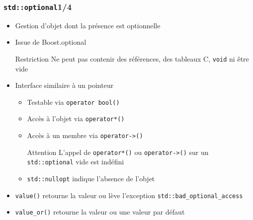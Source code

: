 \documentclass[C++.tex]{subfiles}
\begin{document}
\begin{frame}[fragile]
	\frametitle{\lstinline|std::optional|\titlehfill{}1/4}
	\begin{itemize}
		\item Gestion d'objet dont la présence est optionnelle
		\item Issue de Boost.optional

		\begin{alertblock}{Restriction}
			Ne peut pas contenir des références, des tableaux C, \lstinline|void| ni être vide
		\end{alertblock}

		\item Interface similaire à un pointeur
		\begin{itemize}
			\item Testable via \lstinline|operator bool()|
			\item Accès à l'objet via \lstinline|operator*()|
			\item Accès à un membre via \lstinline|operator->()|

			\begin{alertblock}{Attention}
				L'appel de \lstinline|operator*()| ou \lstinline|operator->()| sur un \lstinline|std::optional| vide est indéfini
			\end{alertblock}

			\item \lstinline|std::nullopt| indique l'absence de l'objet
		\end{itemize}

		\item \lstinline|value()| retourne la valeur ou lève l'exception \lstinline|std::bad_optional_access|
		\item \lstinline|value_or()| retourne la valeur ou une valeur par défaut
	\end{itemize}
\end{frame}
\end{document}
